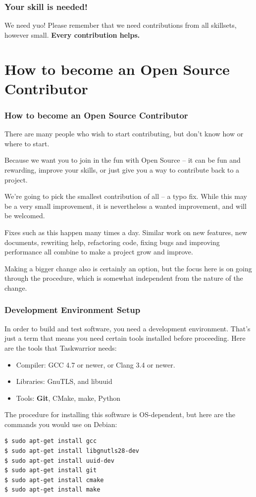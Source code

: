 \documentclass[t,handout]{beamer}
\begin{document}
\begin{frame}[fragile]\frametitle{Your skill is needed!}
    \vfill
    \begin{alertblock}{We need yuo!}
        Please remember that we need contributions from all skillsets, however small. \textbf{Every contribution helps.}
    \end{alertblock}
    \vfill
\end{frame}

\section{How to become an Open Source Contributor}

\begin{frame}[fragile]\frametitle{How to become an Open Source Contributor}
    There are many people who wish to start contributing, but don't know how or where to start.

    Because we want you to join in the fun with Open Source -- it can be fun and rewarding, improve your skills, or just give you a way to contribute back to a project.

    We're going to pick the smallest contribution of all -- a typo fix. While this may be a very small improvement, it is nevertheless a wanted improvement, and will be welcomed.

    Fixes such as this happen many times a day. Similar work on new features, new documents, rewriting help, refactoring code, fixing bugs and improving performance all combine to make a project grow and improve.

    Making a bigger change also is certainly an option, but the focus here is on going through the procedure, which is somewhat independent from the nature of the change.
\end{frame}

\begin{frame}[fragile]\frametitle{Development Environment Setup}
    In order to build and test software, you need a development environment. That's just a term that means you need certain tools installed before proceeding. Here are the tools that Taskwarrior needs:

    \begin{itemize}
    \item Compiler: GCC 4.7 or newer, or Clang 3.4 or newer.
    \item Libraries: GnuTLS, and libuuid
    \item Tools: \textbf{Git}, CMake, make, Python
    \end{itemize}

    The procedure for installing this software is OS-dependent, but here are the commands you would use on Debian:

    \begin{lstlisting}
$ sudo apt-get install gcc
$ sudo apt-get install libgnutls28-dev
$ sudo apt-get install uuid-dev
$ sudo apt-get install git
$ sudo apt-get install cmake
$ sudo apt-get install make\end{lstlisting}
\end{frame}
\end{document}
